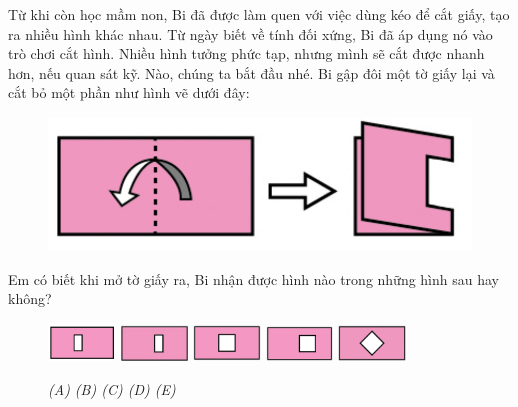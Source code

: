 Từ khi còn học mầm non, Bi  đã được làm quen với việc dùng kéo để cắt giấy, tạo ra nhiều hình khác nhau. Từ ngày biết về tính đối xứng, Bi đã áp dụng nó vào trò chơi cắt hình.
Nhiều hình tưởng phức tạp, nhưng mình sẽ cắt được nhanh hơn, nếu quan sát kỹ.
\vskip 0.1cm
Nào, chúng ta bắt đầu nhé.
\vskip 0.1cm
Bi gập đôi một tờ giấy lại và cắt bỏ một phần như hình vẽ dưới đây: 
	\begin{figure}[H]
		\centering
		\centering
		\vspace*{-10pt}
		\includegraphics[scale=0.4]{cat-1}
		\vspace*{-10pt}
	\end{figure}
Em có biết khi mở tờ giấy ra, Bi nhận được hình nào trong những hình sau hay không?
\begin{figure}[H]
	\centering
	\captionsetup{labelformat=empty}
	\vspace*{-5pt}
	\captionsetup{justification=centering}
	\includegraphics[width =0.16\textwidth]{cat-2a}\quad
	\includegraphics[width =0.16\textwidth]{cat-2b}\quad
	\includegraphics[width =0.16\textwidth]{cat-2c}\quad
	\includegraphics[width =0.16\textwidth]{cat-2d}\quad
	\includegraphics[width =0.16\textwidth]{cat-2e}
	\caption{\small\textit{(A) \hspace*{45pt} (B) \hspace*{45pt} (C) \hspace*{45pt} (D) \hspace*{45pt} (E)}}
	\vspace*{-5pt}
\end{figure}

